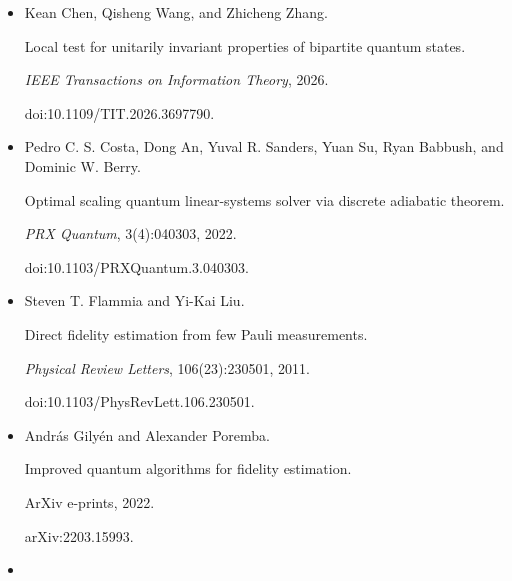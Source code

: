 \documentclass[10pt,a4paper]{article}
\begin{document}
\begin{itemize}
Anthony Chefles.


Quantum state discrimination.


\emph{Contemporary Physics}, 41(6):401–424, 2000.


doi:10.1080/00107510010002599.





\item[] 
[11]

Kean Chen, Qisheng Wang, and Zhicheng Zhang.


Local test for unitarily invariant properties of bipartite quantum
states.


\emph{IEEE Transactions on Information Theory}, 2026.


doi:10.1109/TIT.2026.3697790.





\item[] 
[12]

Pedro C. S. Costa, Dong An, Yuval R. Sanders, Yuan Su, Ryan Babbush, and
Dominic W. Berry.


Optimal scaling quantum linear-systems solver via discrete adiabatic
theorem.


\emph{PRX Quantum}, 3(4):040303, 2022.


doi:10.1103/PRXQuantum.3.040303.





\item[] 
[13]

Steven T. Flammia and Yi-Kai Liu.


Direct fidelity estimation from few Pauli measurements.


\emph{Physical Review Letters}, 106(23):230501, 2011.


doi:10.1103/PhysRevLett.106.230501.





\item[] 
[14]

András Gilyén and Alexander Poremba.


Improved quantum algorithms for fidelity estimation.


ArXiv e-prints, 2022.


arXiv:2203.15993.





\item[] 
[15]


\end{itemize}
\end{document}
